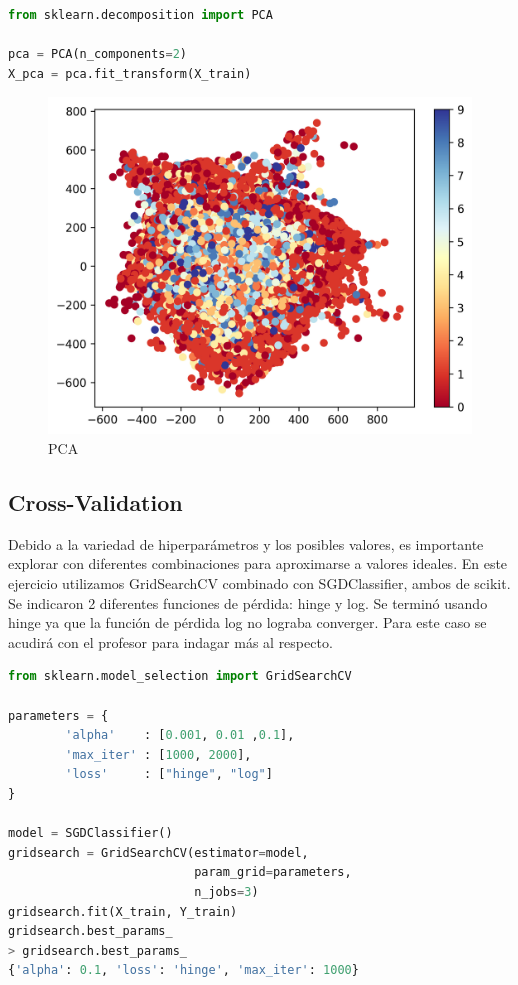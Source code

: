 \documentclass[journal]{IEEEtran}
\begin{document}
\begin{lstlisting}[language=Python]
from sklearn.decomposition import PCA

pca = PCA(n_components=2)
X_pca = pca.fit_transform(X_train)
\end{lstlisting}

\begin{figure}[H]
        \centering
        \includegraphics[width=\linewidth]{figures/pca.png}
        \caption{PCA}
        \label{fig:pca}
\end{figure}

\subsection{Cross-Validation}
Debido a la variedad de hiperparámetros y los posibles valores, es importante explorar con diferentes combinaciones para aproximarse a valores ideales. En este ejercicio utilizamos GridSearchCV\cite{scikit-learn_gridsearchcv} combinado con SGDClassifier, ambos de scikit. Se indicaron 2 diferentes funciones de pérdida: hinge y log. Se terminó usando hinge ya que la función de pérdida log no lograba converger. Para este caso se acudirá con el profesor para indagar más al respecto.

\begin{lstlisting}[language=Python]
from sklearn.model_selection import GridSearchCV

parameters = {
        'alpha'    : [0.001, 0.01 ,0.1],
        'max_iter' : [1000, 2000],
        'loss'     : ["hinge", "log"]
}

model = SGDClassifier()
gridsearch = GridSearchCV(estimator=model,
                          param_grid=parameters,
                          n_jobs=3)
gridsearch.fit(X_train, Y_train)
gridsearch.best_params_
> gridsearch.best_params_
{'alpha': 0.1, 'loss': 'hinge', 'max_iter': 1000}
\end{lstlisting}
\end{document}
